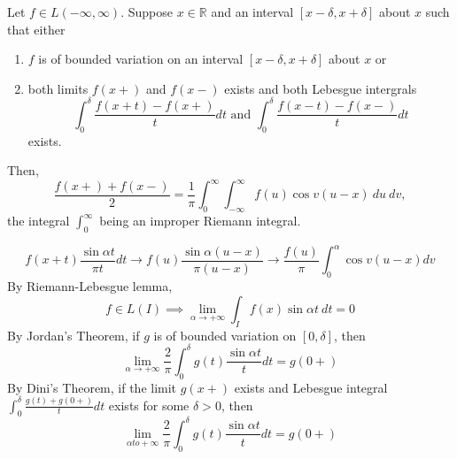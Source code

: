 \begin{theorem}
	Let $f \in L(-\infty,\infty)$. Suppose $x \in \mathbb{R}$ and an interval $[x-\delta,x+\delta]$ about $x$ such that either 
	\begin{enumerate}
		\item $f$ is of bounded variation on an interval $[x-\delta,x+\delta]$ about $x$ or
		\item both limits $f(x+)$ and $f(x-)$ exists and both Lebesgue intergrals
			$$\int_0^\delta \frac{f(x+t)-f(x+)}{t} dt \text{ and }\int_0^\delta \frac{f(x-t)-f(x-)}{t} dt$$
			exists.
	\end{enumerate}
	Then, 
	$$\frac{f(x+)+f(x-)}{2} = \frac{1}{\pi} \int_0^\infty \int_{-\infty}^\infty f(u)\cos v(u-x)\ du\ dv,$$
	the integral $\int_0^\infty$ being an improper Riemann integral.
\end{theorem}
\begin{synopsis}
	$$f(x+t)\frac{\sin \alpha t}{\pi t} dt \to f(u)\frac{\sin \alpha(u-x)}{\pi(u-x)} \to \frac{f(u)}{\pi} \int_0^\alpha \cos v(u-x) dv$$
	By Riemann-Lebesgue lemma\cite[Theorem 11.6]{apostol},
	$$f \in L(I) \implies \lim_{\alpha \to +\infty} \int_I f(x) \sin \alpha t\ dt = 0$$
	By Jordan's Theorem\cite[Theorem 10.8]{apostol}, if $g$ is of bounded variation on $[0,\delta]$, then
	$$\lim_{\alpha \to +\infty} \frac{2}{\pi} \int_0^\delta g(t) \frac{\sin \alpha t}{t} dt = g(0+)$$
	By Dini's Theorem\cite[Theorem 10.9]{apostol}, if the limit $g(x+)$ exists and Lebesgue integral $\int_0^\delta \frac{g(t)+g(0+)}{t} dt$ exists for some $\delta > 0$, then
	$$\lim_{\alpha to +\infty} \frac{2}{\pi} \int_0^\delta g(t) \frac{\sin \alpha t}{t} dt = g(0+)$$
\end{synopsis}
